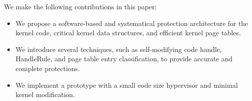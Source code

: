 \documentclass[conference]{IEEEtran}
\begin{document}
We make the following contributions in this paper:
\begin{itemize}
\item We propose a software-based and systematical protection architecture for the kernel code, critical kernel data structures, and efficient kernel page tables. 
\item We introduce several techniques, such as self-modifying code handle, HandleRule, and page table entry classification, to provide accurate and complete protections.\item We implement a prototype with a small code size hypervisor and minimal kernel modification. 
\end{itemize}

\end{document}
